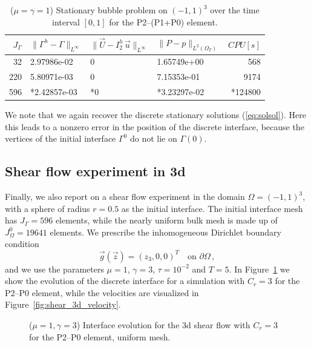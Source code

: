 \documentclass[a4paper,12pt,onecolumn]{article}
\newcommand{\errorXx}{\|\Gamma^h - \Gamma\|_{L^\infty}}
\newcommand{\errorUu}[1]{\|\vec U - I^h_{#1}\,\vec u\|_{L^\infty}}
\newcommand{\LerrorPp}{\|P - p\|_{L^2(\Omega_T)}}
\begin{document}
\begin{table}
\center
\begin{tabular}{rlllr}
\hline
$J_\Gamma$ & $\errorXx$ & $\errorUu2$ & $\LerrorPp$ & $CPU[s]$ \\
\hline
 32 & 2.97986e-02 & 0 & 1.65749e+00 &  568 \\
220 & 5.80971e-03 & 0 & 7.15353e-01 & 9174 \\
596 & *2.42857e-03& *0 & *3.23297e-02 & *124800\\
\hline
\end{tabular}
\caption{($\mu=\gamma=1$) Stationary bubble problem on $(-1,1)^3$ over the time 
interval $[0,1]$ for the P2--(P1+P0) element.}
\label{tab:bubble3Dp2p1p0}
\end{table}

We note that we again recover the discrete stationary solutions 
(\ref{eq:solsol}). Here this leads to a nonzero error in the position of the
discrete interface, because the vertices of the initial interface $\Gamma^0$ do
not lie on $\Gamma(0)$.

\subsection{Shear flow experiment in 3d}
Finally, we also report on a shear flow experiment in the domain 
$\Omega=(-1,1)^3$, with a sphere of radius $r=0.5$ as the initial interface. 
The initial interface mesh has $J_\Gamma = 596$ elements, while the nearly 
uniform bulk mesh is made up of $J_\Omega^0 = 19641$ elements. We prescribe the 
inhomogeneous Dirichlet boundary condition
\begin{equation*}
\vec g(\vec z)=(z_3,0,0)^T\quad \mbox{on }\partial\Omega\,,
\end{equation*}
and we use the parameters $\mu=1$, $\gamma=3$, $\tau=10^{-2}$ and $T=5$. 
In Figure~\ref{fig:shear_3d} we show the evolution of the discrete interface
for a simulation with $C_r=3$ for the P2--P0 element, while the velocities
are visualized in Figure~\ref{fig:shear_3d_velocity}.
\begin{figure}[htbp]
\centering
{}
\caption{($\mu=1,\gamma=3$) Interface evolution for the 3d shear flow with 
$C_r=3$ for the P2--P0 element, uniform mesh.}
\label{fig:shear_3d}
\end{figure}
\end{document}
